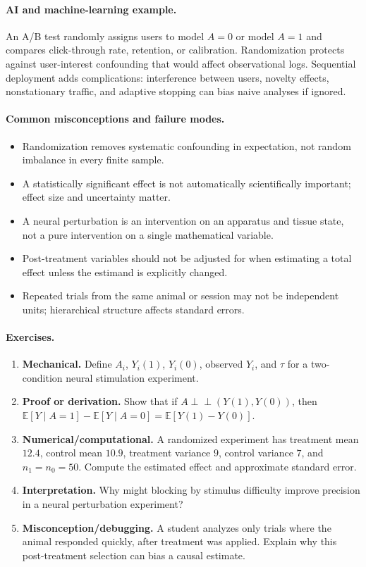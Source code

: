 \paragraph{AI and machine-learning example.}
An A/B test randomly assigns users to model \(A=0\) or model \(A=1\) and compares click-through rate, retention, or calibration. Randomization protects against user-interest confounding that would affect observational logs. Sequential deployment adds complications: interference between users, novelty effects, nonstationary traffic, and adaptive stopping can bias naive analyses if ignored.

\paragraph{Common misconceptions and failure modes.}
\begin{itemize}[leftmargin=*]
\item Randomization removes systematic confounding in expectation, not random imbalance in every finite sample.
\item A statistically significant effect is not automatically scientifically important; effect size and uncertainty matter.
\item A neural perturbation is an intervention on an apparatus and tissue state, not a pure intervention on a single mathematical variable.
\item Post-treatment variables should not be adjusted for when estimating a total effect unless the estimand is explicitly changed.
\item Repeated trials from the same animal or session may not be independent units; hierarchical structure affects standard errors.
\end{itemize}

\paragraph{Exercises.}
\begin{enumerate}[label=\textbf{19.3.\arabic*.}, leftmargin=*]
\item \textbf{Mechanical.} Define \(A_i\), \(Y_i(1)\), \(Y_i(0)\), observed \(Y_i\), and \(\tau\) for a two-condition neural stimulation experiment.
\item \textbf{Proof or derivation.} Show that if \(A\perp\!\!\!\perp (Y(1),Y(0))\), then \(\mathbb E[Y\mid A=1]-\mathbb E[Y\mid A=0]=\mathbb E[Y(1)-Y(0)]\).
\item \textbf{Numerical/computational.} A randomized experiment has treatment mean \(12.4\), control mean \(10.9\), treatment variance \(9\), control variance \(7\), and \(n_1=n_0=50\). Compute the estimated effect and approximate standard error.
\item \textbf{Interpretation.} Why might blocking by stimulus difficulty improve precision in a neural perturbation experiment?
\item \textbf{Misconception/debugging.} A student analyzes only trials where the animal responded quickly, after treatment was applied. Explain why this post-treatment selection can bias a causal estimate.
\end{enumerate}

